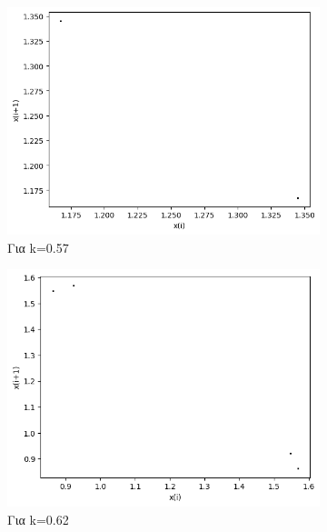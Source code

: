 \begin{figure}[h!]
\begin{subfigure}[b]{0.4\textwidth}
		\includegraphics[width=\textwidth]{LateX images/graphs q09/g5}
		\caption{Για k=0.57}
		\label{f:k50}
	\end{subfigure}
\hfill
	\begin{subfigure}[b]{0.4\textwidth}
		\centering
		\includegraphics[width=\textwidth]{LateX images/graphs q09/g6}
		\caption{Για k=0.62}
		\label{f:k51}
	\end{subfigure}
	\hfill
	\begin{subfigure}[b]{0.4\textwidth}
		\centering

\end{subfigure}
\end{figure}
